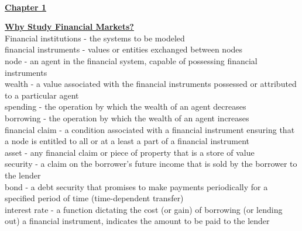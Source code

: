\documentclass[12pt]{article}
\date{}
\begin{document}
 \\

\newpage

\begin{center}
\underline{\bf \huge Chapter 1}
\end{center}

\noindent \underline{\bf Why Study Financial Markets?}\\

 \noindent Financial institutions - the systems to be modeled \\

\noindent financial instruments - values or entities exchanged between nodes\\

\noindent node - an agent in the financial system, capable of possessing financial instruments\\

\noindent wealth - a value associated with the financial instruments possessed or attributed to a particular agent\\

\noindent spending - the operation by which the wealth of an agent decreases\\

\noindent borrowing - the operation by which the wealth of an agent increases\\

\noindent financial claim - a condition associated with a financial instrument ensuring that a node is entitled to all or at a least a part of a financial instrument\\

\noindent asset - any financial claim or piece of property that is a store of value\\

\noindent security -  a claim on the borrower's future income that is sold by the borrower to the lender\\

\noindent bond - a debt security that promises to make payments periodically for a specified period of time (time-dependent transfer)\\

\noindent interest rate - a function dictating the cost (or gain) of borrowing  (or lending out) a financial instrument, indicates the amount to be paid to the lender\\
\end{document}
